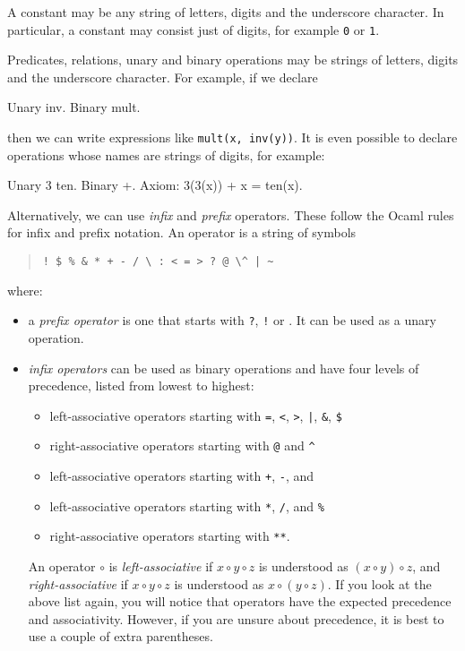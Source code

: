 \documentclass{article}
\begin{document}
A constant may be any string of letters, digits and the underscore
character. In particular, a constant may consist just of digits, for
example \texttt{0} or \texttt{1}.

Predicates, relations, unary and binary operations may be strings of
letters, digits and the underscore character. For example, if we
declare
%
\begin{source}
Unary inv.
Binary mult.
\end{source}
%
then we can write expressions like \texttt{mult(x, inv(y))}. It is
even possible to declare operations whose names are strings of digits,
for example:
%
\begin{source}
Unary 3 ten.
Binary +.
Axiom: 3(3(x)) + x = ten(x).
\end{source}
%
Alternatively, we can use \emph{infix} and \emph{prefix} operators.
These follow the Ocaml rules for infix and prefix notation. An
operator is a string of symbols
%
\begin{quote}
  \verb.! $ % & * + - / \ : < = > ? @ \^ | ~.
\end{quote}
where:
%
\begin{itemize}
\item a \emph{prefix operator} is one that starts with \texttt{?},
  \texttt{!} or \texttt{}. It can be used as a unary operation.
\item \emph{infix operators} can be used as binary operations and have
  four levels of precedence, listed from lowest to highest:
  \begin{itemize}
    \item left-associative operators starting with \texttt{=},
      \texttt{<}, \texttt{>}, \texttt{|}, \texttt{\&}, \texttt{\$}
    \item right-associative operators starting with \texttt{@} and \texttt{\^}
    \item left-associative operators starting with \texttt{+}, \texttt{-},
      and \texttt{}
    \item left-associative operators starting with \texttt{*}, \texttt{/}, and \texttt{\%} 
    \item right-associative operators starting with \texttt{**}.
  \end{itemize}
  An operator $\circ$ is \emph{left-associative} if $x \circ y \circ
  z$ is understood as $(x \circ y) \circ z$, and
  \emph{right-associative} if $x \circ y \circ z$ is understood as $x
  \circ (y \circ z)$. If you look at the above list again, you will
  notice that operators have the expected precedence and
  associativity. However, if you are unsure about precedence, it is
  best to use a couple of extra parentheses.
\end{itemize}
\end{document}
